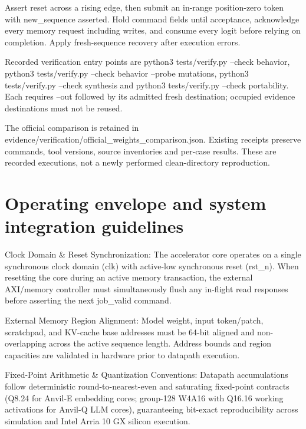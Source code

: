 \documentclass[11pt,a4paper]{article}
\begin{document}
Assert reset across a rising edge,\allowbreak{} then submit an in-range position-zero token with new\_\allowbreak{}sequence asserted. Hold command fields until acceptance,\allowbreak{} acknowledge every memory request including writes,\allowbreak{} and consume every logit before relying on completion. Apply fresh-sequence recovery after execution errors.


Recorded verification entry points are python3 tests/\allowbreak{}verify.py --check behavior,\allowbreak{} python3 tests/\allowbreak{}verify.py --check behavior --probe mutations,\allowbreak{} python3 tests/\allowbreak{}verify.py --check synthesis and python3 tests/\allowbreak{}verify.py --check portability. Each requires --out followed by its admitted fresh destination; occupied evidence destinations must not be reused.


The official comparison is retained in evidence/\allowbreak{}verification/\allowbreak{}official\_\allowbreak{}weights\_\allowbreak{}comparison.json. Existing receipts preserve commands,\allowbreak{} tool versions,\allowbreak{} source inventories and per-case results. These are recorded executions,\allowbreak{} not a newly performed clean-directory reproduction.


\section{Operating envelope and system integration guidelines}

Clock Domain \& Reset Synchronization: The accelerator core operates on a single synchronous clock domain (\allowbreak{}clk)\allowbreak{} with active-low synchronous reset (\allowbreak{}rst\_\allowbreak{}n)\allowbreak{}. When resetting the core during an active memory transaction,\allowbreak{} the external AXI/\allowbreak{}memory controller must simultaneously flush any in-flight read responses before asserting the next job\_\allowbreak{}valid command.


External Memory Region Alignment: Model weight,\allowbreak{} input token/\allowbreak{}patch,\allowbreak{} scratchpad,\allowbreak{} and KV-cache base addresses must be 64-bit aligned and non-overlapping across the active sequence length. Address bounds and region capacities are validated in hardware prior to datapath execution.


Fixed-Point Arithmetic \& Quantization Conventions: Datapath accumulations follow deterministic round-to-nearest-even and saturating fixed-point contracts (\allowbreak{}Q8.24 for Anvil-E embedding cores; group-128 W4A16 with Q16.16 working activations for Anvil-Q LLM cores)\allowbreak{},\allowbreak{} guaranteeing bit-exact reproducibility across simulation and Intel Arria 10 GX silicon execution.
\end{document}

